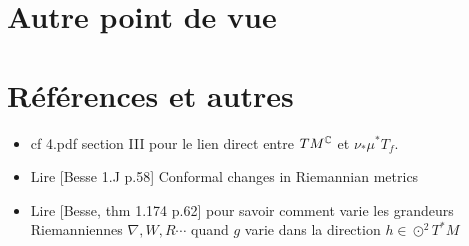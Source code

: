 \documentclass[12pt,makeidx]{amsart}
\begin{document}
\section{Autre point de vue}



\section*{Références et autres}
\begin{itemize}
\item cf 4.pdf section III pour le lien direct entre $TM^{\mathbb{C}}$ et $\nu_*\mu^*T_f$.
\item Lire [Besse 1.J p.58] Conformal changes in Riemannian metrics
\item Lire [Besse, thm 1.174 p.62] pour savoir comment varie les grandeurs Riemanniennes $\nabla, W, R\cdots$ quand $g$ varie dans la direction $h \in \odot^2T^*M$
\end{itemize}
\end{document}
